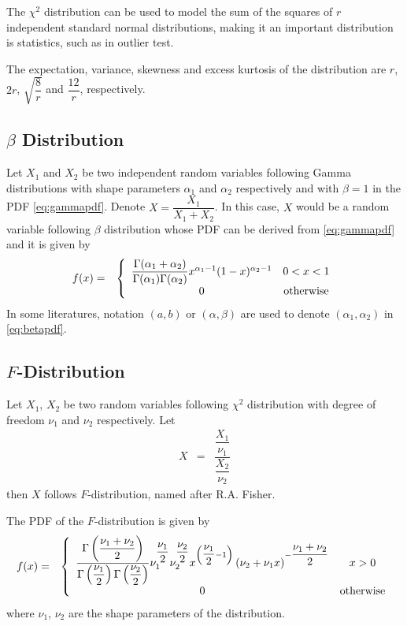 The $\chi^2$ distribution can be used to model the sum of the squares of $r$ independent standard normal distributions, making it an important distribution is statistics, such as in outlier test. 

The expectation, variance, skewness and excess kurtosis of the distribution are $r$, $2r$, $\sqrt{\dfrac{8}{r}}$ and $\dfrac{12}{r}$, respectively.

\subsection{$\beta$ Distribution}

Let $X_1$ and $X_2$ be two independent random variables following Gamma distributions with shape parameters $\alpha_1$ and $\alpha_2$ respectively and with $\beta = 1$ in the PDF \eqref{eq:gammapdf}. Denote $X=\dfrac{X_1}{X_1+X_2}$. In this case, $X$ would be a random variable following $\beta$ distribution whose PDF can be derived from \eqref{eq:gammapdf} and it is given by
\begin{eqnarray}
	f(x) &=& \left\{\begin{array}{cc}
		\dfrac{\Gamma(\alpha_1 + \alpha_2)}{\Gamma(\alpha_1)\Gamma(\alpha_2)}x^{\alpha_1-1}(1-x)^{\alpha_2-1} & 0 < x < 1 \\
		0 & \textup{otherwise}
	\end{array}\right. \label{eq:betapdf}
\end{eqnarray}
In some literatures, notation $(a, b)$ or $(\alpha, \beta)$ are used to denote $(\alpha_1, \alpha_2)$ in \eqref{eq:betapdf}.

\subsection{$F$-Distribution}

Let $X_1$, $X_2$ be two random variables following $\chi^2$ distribution with degree of freedom $\nu_1$ and $\nu_2$ respectively. Let
\begin{eqnarray}
	X &=& \dfrac{\dfrac{X_1}{\nu_1}}{\dfrac{X_2}{\nu_2}} \nonumber
\end{eqnarray}
then $X$ follows $F$-distribution, named after R.A. Fisher.

The PDF of the $F$-distribution is given by
\begin{eqnarray}
	f(x) &=& \left\{\begin{array}{cc}
		\dfrac{\Gamma\left(\dfrac{\nu_1+\nu_2}{2}\right)}{\Gamma\left(\dfrac{\nu_1}{2}\right)\Gamma\left(\dfrac{\nu_2}{2}\right)}\nu_1^{\dfrac{\nu_1}{2}}\nu_2^{\dfrac{\nu_2}{2}}x^{\left(\dfrac{\nu_1}{2}-1\right)}\left(\nu_2+\nu_1 x\right)^{-\dfrac{\nu_1+\nu_2}{2}} & x > 0 \\
		0 & \textup{otherwise}
	\end{array}\right. \nonumber
\end{eqnarray}
where $\nu_1$, $\nu_2$ are the shape parameters of the distribution. 

